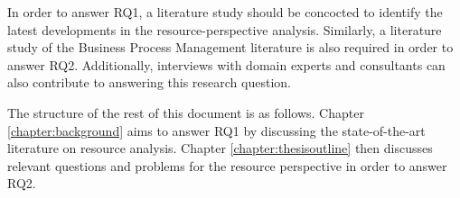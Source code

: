 \noindent
In order to answer RQ1, a literature study should be concocted to identify the latest developments in the resource-perspective analysis. Similarly, a literature study of the Business Process Management literature is also required in order to answer RQ2. Additionally, interviews with domain experts and consultants can also contribute to answering this research question. 

The structure of the rest of this document is as follows. Chapter \ref{chapter:background} aims to answer RQ1 by discussing the state-of-the-art literature on resource analysis. Chapter \ref{chapter:thesisoutline} then discusses relevant questions and problems for the resource perspective in order to answer RQ2. 




















